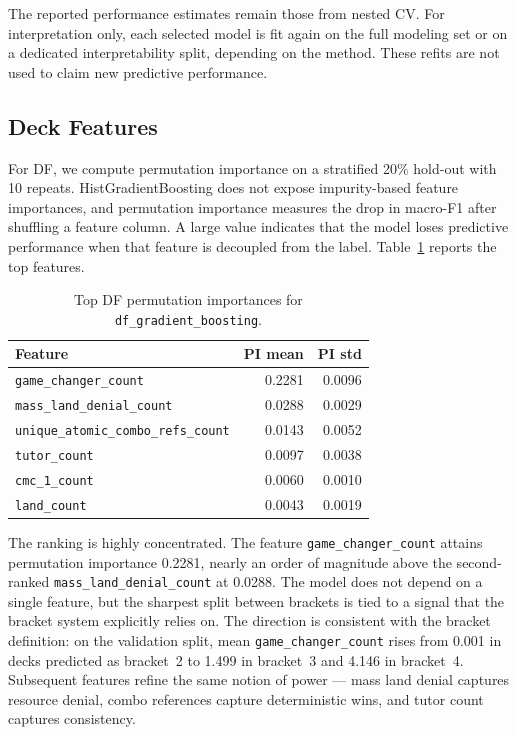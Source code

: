 \documentclass{article}
\begin{document}
The reported performance estimates remain those from nested CV. For interpretation only, each selected model is fit again on the full modeling set or on a dedicated interpretability split, depending on the method. These refits are not used to claim new predictive performance.

\subsection{Deck Features}
\label{sec:interpretability:df}

For DF, we compute permutation importance on a stratified 20\% hold-out with 10 repeats. HistGradientBoosting does not expose impurity-based feature importances, and permutation importance measures the drop in macro-F1 after shuffling a feature column. A large value indicates that the model loses predictive performance when that feature is decoupled from the label. Table~\ref{tab:df-interpretability} reports the top features.

\begin{table}[h]
\centering
\caption{Top DF permutation importances for \texttt{df\_gradient\_boosting}.}
\label{tab:df-interpretability}
\small
\begin{tabular}{lrr}
\toprule
Feature & PI mean & PI std \\
\midrule
\texttt{game\_changer\_count} & 0.2281 & 0.0096 \\
\texttt{mass\_land\_denial\_count} & 0.0288 & 0.0029 \\
\texttt{unique\_atomic\_combo\_refs\_count} & 0.0143 & 0.0052 \\
\texttt{tutor\_count} & 0.0097 & 0.0038 \\
\texttt{cmc\_1\_count} & 0.0060 & 0.0010 \\
\texttt{land\_count} & 0.0043 & 0.0019 \\
\bottomrule
\end{tabular}
\end{table}

The ranking is highly concentrated. The feature \texttt{game\_changer\_count} attains permutation importance 0.2281, nearly an order of magnitude above the second-ranked \texttt{mass\_land\_denial\_count} at 0.0288. The model does not depend on a single feature, but the sharpest split between brackets is tied to a signal that the bracket system explicitly relies on. The direction is consistent with the bracket definition: on the validation split, mean \texttt{game\_changer\_count} rises from 0.001 in decks predicted as bracket~2 to 1.499 in bracket~3 and 4.146 in bracket~4. Subsequent features refine the same notion of power --- mass land denial captures resource denial, combo references capture deterministic wins, and tutor count captures consistency.
\end{document}
